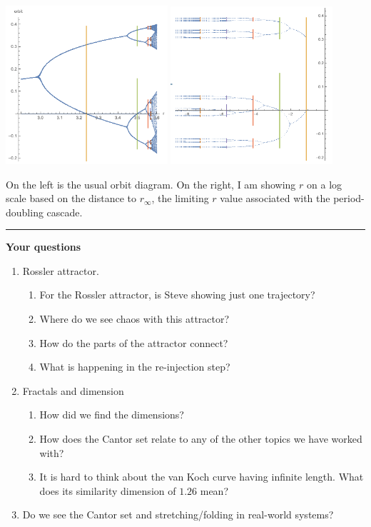 \documentclass[12pt,letterpaper,noanswers]{exam}
\begin{document}
\includegraphics[width=0.45\textwidth]{img/191111-C28p1a.png}
\includegraphics[width=0.45\textwidth]{img/191111-C28p1b.png}

On the left is the usual orbit diagram.  On the right, I am showing $r$ on a log scale based on the distance to $r_{\infty}$, the limiting $r$ value associated with the period-doubling cascade.

\vspace{0.2cm}
\hrule
\vspace{0.2cm}
\noindent\textbf{Your questions}
\begin{enumerate}
    \item Rossler attractor.
    \begin{enumerate}
    \item For the Rossler attractor, is Steve showing just one trajectory?
    \item Where do we see chaos with this attractor?
    \item How do the parts of the attractor connect?
    \item What is happening in the re-injection step?
    \end{enumerate}
    \item Fractals and dimension
    \begin{enumerate}
        \item How did we find the dimensions?
        \item How does the Cantor set relate to any of the other topics we have worked with?
        \item It is hard to think about the van Koch curve having infinite length.  What does its similarity dimension of $1.26$ mean?
    \end{enumerate}
    \item Do we see the Cantor set and stretching/folding in real-world systems?
\end{enumerate}
\end{document}
